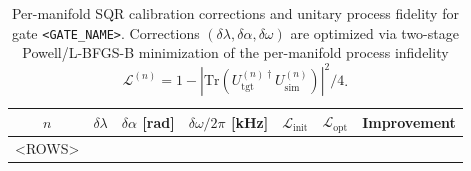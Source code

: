 \begin{table}[h]
\centering
\caption{Per-manifold SQR calibration corrections and unitary process fidelity
for gate \texttt{<GATE\_NAME>}. Corrections $(\delta\lambda, \delta\alpha,
\delta\omega)$ are optimized via two-stage Powell/L-BFGS-B minimization of the
per-manifold process infidelity $\mathcal{L}^{(n)} = 1 -
|\mathrm{Tr}(U_{\mathrm{tgt}}^{(n)\dagger} U_{\mathrm{sim}}^{(n)})|^2 / 4$.}
\label{tab:sqr_calibration_levels}
\begin{tabular}{cS[table-format=+1.4]S[table-format=+1.4]S[table-format=+4.1]S[table-format=1.2e-1]S[table-format=1.2e-1]S[table-format=1.1e+1]}
\hline
$n$ & {$\delta\lambda$} & {$\delta\alpha$ [rad]} & {$\delta\omega/2\pi$ [kHz]} & {$\mathcal{L}_{\mathrm{init}}$} & {$\mathcal{L}_{\mathrm{opt}}$} & {Improvement} \\
\hline
<ROWS>
\hline
\end{tabular}
\end{table}
